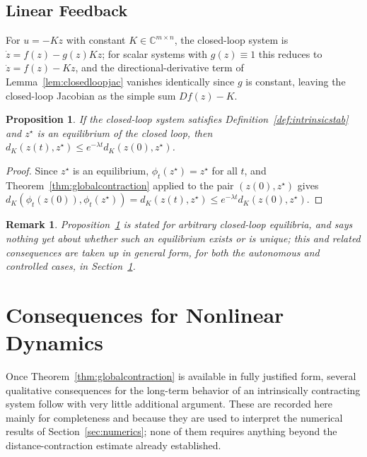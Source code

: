 \documentclass[preprint,12pt,authoryear]{elsarticle}
\newtheorem{remark}{Remark}
\newtheorem{proof}{Proof}
\newtheorem{proposition}{Proposition}
\begin{document}
\subsection{Linear Feedback}

For $u=-Kz$ with constant $K\in\mathbb{C}^{m\times n}$, the closed-loop system is $\dot z=f(z)-g(z)Kz$; for scalar systems with $g(z)\equiv1$ this reduces to $\dot z=f(z)-Kz$, and the directional-derivative term of Lemma~\ref{lem:closedloopjac} vanishes identically since $g$ is constant, leaving the closed-loop Jacobian as the simple sum $Df(z)-K$.

\begin{proposition}
\label{prop:linearfeedback}
If the closed-loop system satisfies Definition~\ref{def:intrinsicstab} and $z^\star$ is an equilibrium of the closed loop, then $d_K(z(t),z^\star)\le e^{-\lambda t}d_K(z(0),z^\star)$.
\end{proposition}

\begin{proof}
Since $z^\star$ is an equilibrium, $\phi_t(z^\star)=z^\star$ for all $t$, and Theorem~\ref{thm:globalcontraction} applied to the pair $(z(0),z^\star)$ gives $d_K(\phi_t(z(0)),\phi_t(z^\star))=d_K(z(t),z^\star)\le e^{-\lambda t}d_K(z(0),z^\star)$.
\end{proof}

\begin{remark}
Proposition~\ref{prop:linearfeedback} is stated for arbitrary closed-loop equilibria, and says nothing yet about whether such an equilibrium exists or is unique; this and related consequences are taken up in general form, for both the autonomous and controlled cases, in Section~\ref{sec:consequences}.
\end{remark}

\section{Consequences for Nonlinear Dynamics}
\label{sec:consequences}

Once Theorem~\ref{thm:globalcontraction} is available in fully justified form, several qualitative consequences for the long-term behavior of an intrinsically contracting system follow with very little additional argument. These are recorded here mainly for completeness and because they are used to interpret the numerical results of Section~\ref{sec:numerics}; none of them requires anything beyond the distance-contraction estimate already established.
\end{document}
